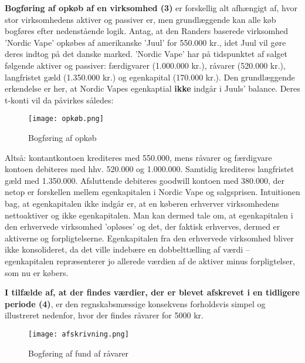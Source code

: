 \documentclass[10pt,reqno, usenames]{article}
\begin{document}
\vspace{10 pt}

\textbf{Bogføring af opkøb af en virksomhed (3)} er forskellig alt afhængigt af, hvor stor virksomhedens aktiver og passiver er, men grundlæggende kan alle køb bogføres efter nedenstående logik. Antag, at den Randers baserede virksomhed 'Nordic Vape' opkøbes af amerikanske 'Juul' for 550.000 kr., idet Juul vil gøre deres indtog på det danske marked. 'Nordic Vape' har på tidspunktet af salget følgende aktiver og passiver: færdigvarer (1.000.000 kr.), råvarer (520.000 kr.), langfristet gæld (1.350.000 kr.) og egenkapital (170.000 kr.). Den grundlæggende erkendelse er her, at Nordic Vapes egenkaptial \textbf{ikke} indgår i Juuls' balance. Deres t-konti vil da påvirkes således: 

\begin{figure}[h]
     \centering
     \texttt{[image: opkøb.png]}
     \caption{Bogføring af opkøb}
     \label{Figur 1}
\end{figure} 

Altså: kontantkontoen krediteres med 550.000, mens råvarer og færdigvare kontoen debiteres med hhv. 520.000 og 1.000.000. Samtidig krediteres langfristet gæld med 1.350.000. Afsluttende debiteres goodwill kontoen med 380.000, der netop er forskellen mellem egenkapitalen i Nordic Vape og salgsprisen. Intuitionen bag, at egenkapitalen ikke indgår er, at en køberen erhverver virksomhedens nettoaktiver og ikke egenkapitalen. Man kan dermed tale om, at egenkapitalen i den erhvervede virksomhed 'opløses' og det, der faktisk erhverves, dermed er aktiverne og forpligtelserne. Egenkapitalen fra den erhvervede virksomhed bliver ikke konsolideret, da det ville indebære en dobbelttælling af værdi – egenkapitalen repræsenterer jo allerede værdien af de aktiver minus forpligtelser, som nu er købers.


\vspace{10 pt}

\textbf{I tilfælde af, at der findes værdier, der er blevet afskrevet i en tidligere periode (4)}, er den regnskabsmæssige konsekvens forholdsvis simpel og illustreret nedenfor, hvor der findes råvarer for 5000 kr. 

\begin{figure}[h]
     \centering
     \texttt{[image: afskrivning.png]}
     \caption{Bogføring af fund af råvarer}
     \label{Figur 1}
\end{figure} 

\vspace{10 pt}
\end{document}
